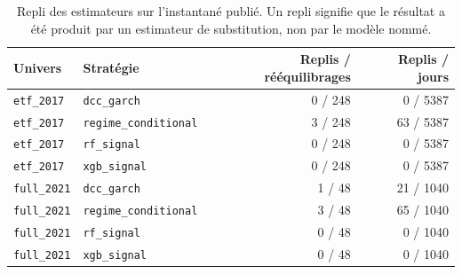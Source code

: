 
\begin{table}[htbp]
  \centering
  \small
  \caption[Intégrité des modèles]{Repli des estimateurs sur l'instantané publié. Un repli signifie que le résultat a été produit par un estimateur de substitution, non par le modèle nommé.}
  \label{tab:integrite}
  \begin{tabular}{@{}llrr@{}}
    \toprule
    Univers & Stratégie & Replis / rééquilibrages & Replis / jours \\
    \midrule
    \texttt{etf\_2017} & \texttt{dcc\_garch} & 0 / 248 & 0 / 5387 \\
    \texttt{etf\_2017} & \texttt{regime\_conditional} & 3 / 248 & 63 / 5387 \\
    \texttt{etf\_2017} & \texttt{rf\_signal} & 0 / 248 & 0 / 5387 \\
    \texttt{etf\_2017} & \texttt{xgb\_signal} & 0 / 248 & 0 / 5387 \\
    \texttt{full\_2021} & \texttt{dcc\_garch} & 1 / 48 & 21 / 1040 \\
    \texttt{full\_2021} & \texttt{regime\_conditional} & 3 / 48 & 65 / 1040 \\
    \texttt{full\_2021} & \texttt{rf\_signal} & 0 / 48 & 0 / 1040 \\
    \texttt{full\_2021} & \texttt{xgb\_signal} & 0 / 48 & 0 / 1040 \\
    \bottomrule
  \end{tabular}
\end{table}
